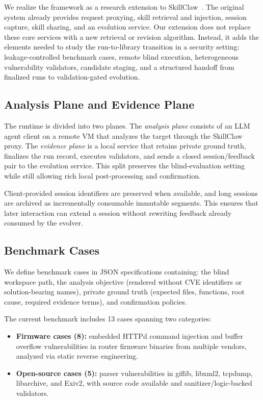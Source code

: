 ﻿\documentclass[preprint,12pt]{elsarticle}
\begin{document}
We realize the framework as a research extension to
SkillClaw~\cite{skillclaw}.  The original system already provides request
proxying, skill retrieval and injection, session capture, skill sharing,
and an evolution service.  Our extension does not replace these core
services with a new retrieval or revision algorithm.  Instead, it adds the
elements needed to study the run-to-library transition in a security
setting: leakage-controlled benchmark cases, remote blind execution,
heterogeneous vulnerability validators, candidate staging, and a structured
handoff from finalized runs to validation-gated evolution.

\subsection{Analysis Plane and Evidence Plane}

The runtime is divided into two planes.  The \emph{analysis plane} consists
of an LLM agent client on a remote VM that analyzes the target through the
SkillClaw proxy.  The \emph{evidence plane} is a local service that retains
private ground truth, finalizes the run record, executes validators, and
sends a closed session/feedback pair to the evolution service.  This split
preserves the blind-evaluation setting while still allowing rich local
post-processing and confirmation.

Client-provided session identifiers are preserved when available, and long
sessions are archived as incrementally consumable immutable segments.  This
ensures that later interaction can extend a session without rewriting
feedback already consumed by the evolver.

\subsection{Benchmark Cases}

We define benchmark cases in JSON specifications containing: the blind
workspace path, the analysis objective (rendered without CVE identifiers or
solution-bearing names), private ground truth (expected files, functions,
root cause, required evidence terms), and confirmation policies.

The current benchmark includes 13 cases spanning two categories:
\begin{itemize}[leftmargin=*]
    \item \textbf{Firmware cases (8):} embedded HTTPd command injection
    and buffer overflow vulnerabilities in router firmware binaries from
    multiple vendors, analyzed via static reverse engineering.
    \item \textbf{Open-source cases (5):} parser vulnerabilities in
    giflib, libxml2, tcpdump, libarchive, and Exiv2, with source code
    available and sanitizer/logic-backed validators.
\end{itemize}
\end{document}
